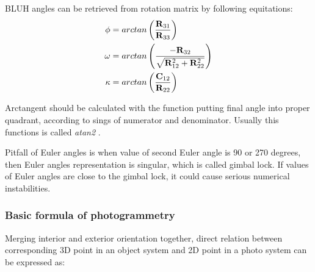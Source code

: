 \documentclass[a4paper,12pt]{article}
\newcommand{\ematr}[1]{
{\bf #1}
}
\newcommand{\escal}[1]{
{\it #1}
}
\newcommand{\term}[1]{
{\it #1}%
}
\begin{document}
BLUH angles can be retrieved from rotation matrix by following equitations: 
 \begin{equation}
 \begin{split}
\escal{\phi} &=  arctan \left(\frac{\ematr{R}_{31}}{\ematr{R}_{33}} \right)\\
\escal{\omega} &= arctan \left(\frac{-\ematr{R}_{32}}{ \sqrt{ \ematr{R}_{12}^{2} + \ematr{R}_{22}^{2} }} \right)\\
\escal{\kappa} &=  arctan \left(\frac{\ematr{C}_{12}}{\ematr{R}_{22}} \right)
\end{split}
\end{equation}


Arctangent should be calculated with the function putting final angle into proper quadrant, according to sings of numerator 
and denominator. Usually this functions is called \term{atan2}. 

Pitfall of Euler angles is when value of second Euler angle is 90 or 270 degrees,  
then Euler angles representation is singular, which is called gimbal lock. 
If values  of Euler angles are close to the gimbal lock, it could cause serious numerical instabilities.

\subsubsection{Basic formula of photogrammetry}

Merging interior and exterior orientation together, direct relation between corresponding 3D point in an object system and 2D point
in a photo system can be expressed as:
\end{document}
